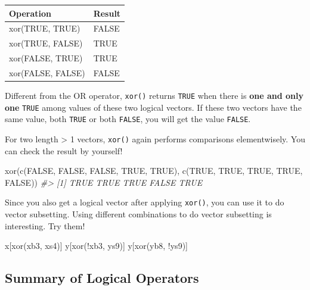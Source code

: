 \documentclass[
]{book}
\newenvironment{Shaded}{\begin{snugshade}}{\end{snugshade}}
\newcommand{\CommentTok}[1]{\textcolor[rgb]{0.56,0.35,0.01}{\textit{#1}}}
\newcommand{\ConstantTok}[1]{\textcolor[rgb]{0.00,0.00,0.00}{#1}}
\newcommand{\FunctionTok}[1]{\textcolor[rgb]{0.00,0.00,0.00}{#1}}
\newcommand{\NormalTok}[1]{#1}
\newcommand{\SpecialCharTok}[1]{\textcolor[rgb]{0.00,0.00,0.00}{#1}}
\begin{document}
\begin{tabular}{l|l}
\hline
Operation & Result\\
\hline
xor(TRUE, TRUE) & FALSE\\
\hline
xor(TRUE, FALSE) & TRUE\\
\hline
xor(FALSE, TRUE) & TRUE\\
\hline
xor(FALSE, FALSE) & FALSE\\
\hline
\end{tabular}

Different from the OR operator, \texttt{xor()} returns \texttt{TRUE} when there is \textbf{one and only one} \texttt{TRUE} among values of these two logical vectors. If these two vectors have the same value, both \texttt{TRUE} or both \texttt{FALSE}, you will get the value \texttt{FALSE}.

For two length \textgreater{} 1 vectors, \texttt{xor()} again performs comparisons elementwisely. You can check the result by yourself!

\begin{Shaded}
\begin{Highlighting}[]
\FunctionTok{xor}\NormalTok{(}\FunctionTok{c}\NormalTok{(}\ConstantTok{FALSE}\NormalTok{, }\ConstantTok{FALSE}\NormalTok{, }\ConstantTok{FALSE}\NormalTok{, }\ConstantTok{TRUE}\NormalTok{, }\ConstantTok{TRUE}\NormalTok{), }\FunctionTok{c}\NormalTok{(}\ConstantTok{TRUE}\NormalTok{, }\ConstantTok{TRUE}\NormalTok{, }\ConstantTok{TRUE}\NormalTok{, }\ConstantTok{TRUE}\NormalTok{, }\ConstantTok{FALSE}\NormalTok{))}
\CommentTok{\#\textgreater{} [1]  TRUE  TRUE  TRUE FALSE  TRUE}
\end{Highlighting}
\end{Shaded}

Since you also get a logical vector after applying \texttt{xor()}, you can use it to do vector subsetting. Using different combinations to do vector subsetting is interesting. Try them!

\begin{Shaded}
\begin{Highlighting}[]
\NormalTok{x[}\FunctionTok{xor}\NormalTok{(xb3, xs4)]}
\NormalTok{y[}\FunctionTok{xor}\NormalTok{(}\SpecialCharTok{!}\NormalTok{xb3, ys9)]}
\NormalTok{y[}\FunctionTok{xor}\NormalTok{(yb8, }\SpecialCharTok{!}\NormalTok{ys9)]}
\end{Highlighting}
\end{Shaded}

\hypertarget{summary-of-logical-operators}{%
\subsection{Summary of Logical Operators}\label{summary-of-logical-operators}}
\end{document}
